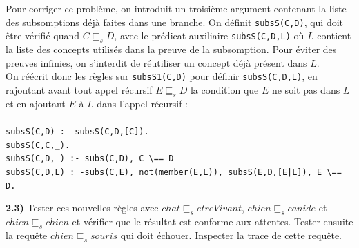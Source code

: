 \documentclass[a4paper,12pt]{report}
\begin{document}

\newpage

Pour corriger ce problème, on introduit un troisième argument contenant la liste des subsomptions déjà faites dans une branche. On définit \texttt{subsS(C,D)},
    qui doit être vérifié quand \(C \sqsubseteq_s D\), avec le prédicat auxiliaire \texttt{subsS(C,D,L)} où \(L\) contient la liste des concepts utilisés
    dans la preuve de la subsomption. Pour éviter des preuves infinies, on s'interdit de réutiliser un concept déjà présent dans \(L\).\\

On réécrit donc les règles sur \texttt{subsS1(C,D)} pour définir \texttt{subsS(C,D,L)}, en rajoutant avant tout appel récursif \(E \sqsubseteq_s D\)
    la condition que \(E\) ne soit pas dans \(L\) et en ajoutant \(E\) à \(L\) dans l'appel récursif :\\\\
\texttt{subsS(C,D) :- subsS(C,D,[C]).}\\
\texttt{subsS(C,C,\_).}\\
\texttt{subsS(C,D,\_) :- subs(C,D), C \textbackslash== D}\\
\texttt{subsS(C,D,L) : -subs(C,E), not(member(E,L)), subsS(E,D,[E|L]), E \textbackslash== D.}\\



\vspace{0.5cm}

{}



\textbf{2.3)} Tester ces nouvelles règles avec \(chat \sqsubseteq_s etreVivant\), \(chien \sqsubseteq_s canide\) et \(chien \sqsubseteq_s chien\) et
    vérifier que le résultat est conforme aux attentes. Tester ensuite la requête \(chien \sqsubseteq_s souris\) qui doit échouer. Inspecter la trace
    de cette requête.
\end{document}

